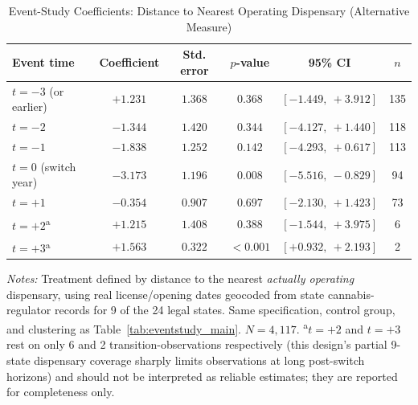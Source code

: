 \begin{table}[htbp]
\centering
\caption{Event-Study Coefficients: Distance to Nearest Operating Dispensary (Alternative Measure)}
\label{tab:eventstudy_dispensary}
\begin{tabular}{lccccc}
\toprule
Event time & Coefficient & Std. error & $p$-value & 95\% CI & $n$ \\
\midrule
$t=-3$ (or earlier)  & $+1.231$  & $1.368$ & $0.368$ & $[-1.449,\ +3.912]$ & 135 \\
$t=-2$               & $-1.344$  & $1.420$ & $0.344$ & $[-4.127,\ +1.440]$ & 118 \\
$t=-1$               & $-1.838$  & $1.252$ & $0.142$ & $[-4.293,\ +0.617]$ & 113 \\
$t=0$ (switch year)  & $-3.173$  & $1.196$ & $0.008$ & $[-5.516,\ -0.829]$ & 94 \\
$t=+1$               & $-0.354$  & $0.907$ & $0.697$ & $[-2.130,\ +1.423]$ & 73 \\
$t=+2$\textsuperscript{a}  & $+1.215$  & $1.408$ & $0.388$ & $[-1.544,\ +3.975]$ & 6 \\
$t=+3$\textsuperscript{a}  & $+1.563$  & $0.322$ & $<0.001$ & $[+0.932,\ +2.193]$ & 2 \\
\bottomrule
\end{tabular}
\begin{minipage}{0.95\textwidth}
\vspace{0.3em}
\footnotesize
\textit{Notes:} Treatment defined by distance to the nearest \emph{actually operating} dispensary, using real
license/opening dates geocoded from state cannabis-regulator records for 9 of the 24 legal states. Same
specification, control group, and clustering as Table~\ref{tab:eventstudy_main}. $N=4{,}117$.
\textsuperscript{a}$t=+2$ and $t=+3$ rest on only 6 and 2 transition-observations respectively (this design's
partial 9-state dispensary coverage sharply limits observations at long post-switch horizons) and should not be
interpreted as reliable estimates; they are reported for completeness only.
\end{minipage}
\end{table}
